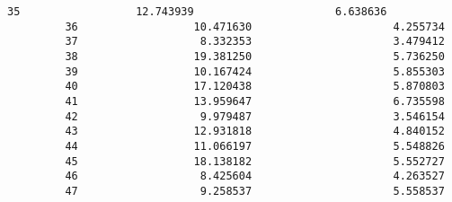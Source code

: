 \documentclass[11pt]{article}
\begin{document}
\begin{Verbatim}[commandchars=\\\{\}]
         35                  12.743939                      6.638636   
         36                  10.471630                      4.255734   
         37                   8.332353                      3.479412   
         38                  19.381250                      5.736250   
         39                  10.167424                      5.855303   
         40                  17.120438                      5.870803   
         41                  13.959647                      6.735598   
         42                   9.979487                      3.546154   
         43                  12.931818                      4.840152   
         44                  11.066197                      5.548826   
         45                  18.138182                      5.552727   
         46                   8.425604                      4.263527   
         47                   9.258537                      5.558537   
         

\end{Verbatim}
\end{document}
